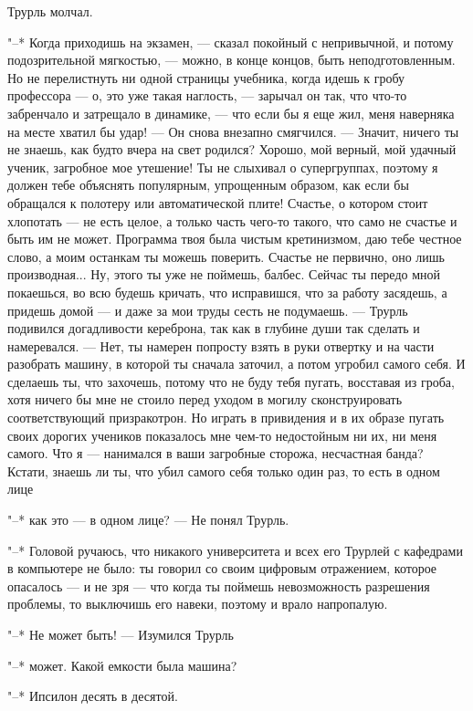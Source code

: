 Трурль молчал.

"--* Когда приходишь на экзамен, --- сказал покойный с
непривычной, и потому подозрительной мягкостью, --- можно, в
конце концов, быть неподготовленным. Но не перелистнуть ни
одной страницы учебника, когда идешь к гробу профессора --- о,
это уже такая наглость, --- зарычал он так, что что-то
забренчало и затрещало в динамике, --- что если бы я еще жил,
меня наверняка на месте хватил бы удар! --- Он снова внезапно
смягчился. --- Значит, ничего ты не знаешь, как будто вчера
на свет родился? Хорошо, мой верный, мой удачный ученик,
загробное мое утешение! Ты не слыхивал о супергруппах,
поэтому я должен тебе объяснять популярным, упрощенным
образом, как если бы обращался к полотеру или автоматической
плите! Счастье, о котором стоит хлопотать --- не есть целое, а
только часть чего-то такого, что само не счастье и быть им
не может. Программа твоя была чистым кретинизмом, даю тебе
честное слово, а моим останкам ты можешь поверить. Счастье
не первично, оно лишь производная... Ну, этого ты уже не
поймешь, балбес. Сейчас ты передо мной покаешься, во всю
будешь кричать, что исправишся, что за работу засядешь, а
придешь домой --- и даже за мои труды сесть не подумаешь. --- Трурль
подивился догадливости кереброна, так как в глубине
души так сделать и намеревался. --- Нет, ты намерен попросту
взять в руки отвертку и на части разобрать машину, в которой
ты сначала заточил, а потом угробил самого себя. И сделаешь
ты, что захочешь, потому что не буду тебя пугать, восставая
из гроба, хотя ничего бы мне не стоило перед уходом в могилу
сконструировать соответствующий призракотрон. Но играть в
привидения и в их образе пугать своих дорогих учеников
показалось мне чем-то недостойным ни их, ни меня самого. Что
я --- нанимался в ваши загробные сторожа, несчастная банда?
Кстати, знаешь ли ты, что убил самого себя только один раз,
то есть в одном лице

"--* как это --- в одном лице? --- Не понял Трурль.

"--* Головой ручаюсь, что никакого университета и всех его
Трурлей с кафедрами в компьютере не было: ты говорил со
своим цифровым отражением, которое опасалось --- и не зря --- что
когда ты поймешь невозможность разрешения проблемы, то
выключишь его навеки, поэтому и врало напропалую.

"--* Не может быть! --- Изумился Трурль

"--* может. Какой емкости была машина?

"--* Ипсилон десять в десятой.


